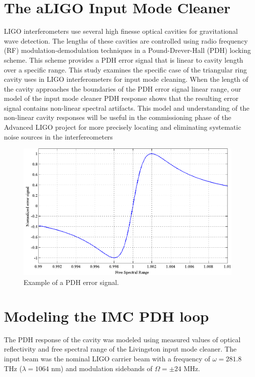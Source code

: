 \section{The aLIGO Input Mode Cleaner}

LIGO interferometers use several high finesse optical cavities for gravitational wave 
detection. The lengths of these cavities are controlled using radio frequency 
(RF) modulation-demodulation techniques in a Pound-Drever-Hall (PDH) locking scheme. 
This scheme provides a PDH error signal that is linear to cavity length over a 
specific range. This study examines the specific case of the triangular ring cavity 
uses in LIGO interferometers for input mode cleaning. When the length of the cavity 
approaches the boundaries of the PDH error signal linear range, our model of the 
input mode cleaner PDH response shows that the resulting error signal contains 
non-linear spectral artifacts. This model and understanding of the non-linear 
cavity responses will be useful in the commissioning phase of the Advanced LIGO 
project for more precisely locating and eliminating systematic noise sources in 
the interfereometers

\begin{figure}[h!]
\centering
\includegraphics[width=\textwidth]{figures/IMCUpconversion/linear_pdh}
\caption[Example of a PDH error signal]{Example of a PDH error signal.}
\end{figure}

\section{Modeling the IMC PDH loop}

The PDH response of the cavity was modeled using measured values of optical reflectivity and free spectral range of the Livingston input mode cleaner. The input beam was the nominal LIGO carrier beam with a frequency of $\omega = 281.8$ THz ($\lambda = 1064$ nm) and modulation sidebands of $\Omega = \pm24$ MHz.

